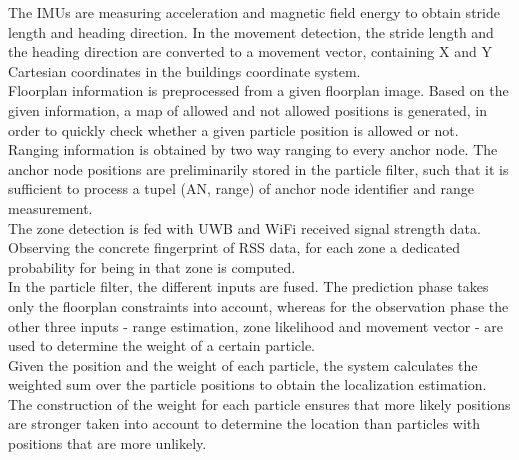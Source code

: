 \noindent\hspace*{5mm}%
The IMUs are measuring acceleration and magnetic field energy to obtain stride length and heading direction. In the movement detection, the stride length and the heading direction are converted to a movement vector, containing X and Y Cartesian coordinates in the buildings coordinate system.\\
\noindent\hspace*{5mm}%
Floorplan information is preprocessed from a given floorplan image. Based on the given information, a map of allowed and not allowed positions is generated, in order to quickly check whether a given particle position is allowed or not.\\
\noindent\hspace*{5mm}%
Ranging information is obtained by two way ranging to every anchor node. The anchor node positions are preliminarily stored in the particle filter, such that it is sufficient to process a tupel (AN, range) of anchor node identifier and range measurement.\\
\noindent\hspace*{5mm}%
The zone detection is fed with UWB and WiFi received signal strength data. Observing the concrete fingerprint of RSS data, for each zone a dedicated probability for being in that zone is computed.\\
\noindent\hspace*{5mm}%
In the particle filter, the different inputs are fused. The prediction phase takes only the floorplan constraints into account, whereas for the observation phase the other three inputs - range estimation, zone likelihood and movement vector - are used to determine the weight of a certain particle.\\
\noindent\hspace*{5mm}%
Given the position and the weight of each particle, the system calculates the weighted sum over the particle positions to obtain the localization estimation. The construction of the weight for each particle ensures that more likely positions are stronger taken into account to determine the location than particles with positions that are more unlikely.